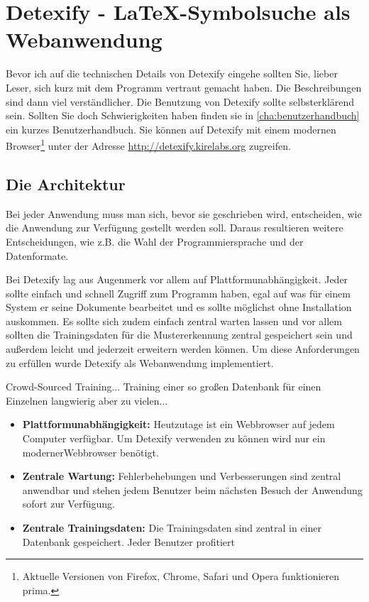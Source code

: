 \chapter[Detexify]{Detexify - \LaTeX-Symbolsuche als Webanwendung} %
\label{cha:detexify}

Bevor ich auf die technischen Details von Detexify eingehe sollten Sie, lieber Leser, sich kurz mit dem Programm vertraut gemacht haben. Die Beschreibungen sind dann viel verständlicher. Die Benutzung von Detexify sollte selbsterklärend sein. Sollten Sie doch Schwierigkeiten haben finden sie in \ref{cha:benutzerhandbuch} ein kurzes Benutzerhandbuch. Sie können auf Detexify mit einem modernen Browser\footnote[1]{Aktuelle Versionen von Firefox, Chrome, Safari und Opera funktionieren prima.} unter der Adresse \url{http://detexify.kirelabs.org} zugreifen.

\section{Die Architektur} %
\label{sec:architektur}

Bei jeder Anwendung muss man sich, bevor sie geschrieben wird, entscheiden, wie die Anwendung zur Verfügung gestellt werden soll. Daraus resultieren weitere Entscheidungen, wie z.B. die Wahl der Programmiersprache und der Datenformate.

Bei Detexify lag aus Augenmerk vor allem auf Plattformunabhängigkeit. Jeder sollte einfach und schnell Zugriff zum Programm haben, egal auf was für einem System er seine Dokumente bearbeitet und es sollte möglichst ohne Installation auskommen. Es sollte sich zudem einfach zentral warten lassen und vor allem sollten die Trainingsdaten für die Mustererkennung zentral gespeichert sein und außerdem leicht und jederzeit erweitern werden können. Um diese Anforderungen zu erfüllen wurde Detexify als Webanwendung implementiert.

\TODO Crowd-Sourced Training... Training einer so großen Datenbank für einen Einzelnen langwierig aber zu vielen...

\begin{itemize}
  \item \textbf{Plattformunabhängigkeit:} Heutzutage ist ein Webbrowser auf jedem Computer verfügbar. Um Detexify verwenden zu können wird nur ein moderner\footnotemark[1] Webbrowser benötigt.
  \item \textbf{Zentrale Wartung:} Fehlerbehebungen und Verbesserungen sind zentral anwendbar und stehen jedem Benutzer beim nächsten Besuch der Anwendung sofort zur Verfügung.
  \item \textbf{Zentrale Trainingsdaten:} Die Trainingsdaten sind zentral in einer Datenbank gespeichert. Jeder Benutzer profitiert 
\end{itemize}

